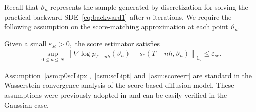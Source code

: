 \documentclass[11pt]{article}
\def\Ltwo{\mathbb L_2}
\def\l|{\left\lVert}
\def\r|{\right\rVert}
\begin{document}
Recall that $\vartheta_n$ represents the sample generated by discretization for solving the practical backward SDE~\eqref{eq:backward1} after $n$ iterations. 
We require the following assumption on the score-matching approximation at each point $\vartheta_n$.
\begin{assumption}
    \label{asm:scoreerr}
Given a small $\varepsilon_{sc}>0,$ the score estimator satisfies
    \begin{align*}
        \sup\limits_{0\leqslant n\leqslant N}\l|\nabla\log p_{T-nh}(\vartheta_n)-s_*(T-nh,\vartheta_n)\r|_{\Ltwo}\leqslant \varepsilon_{sc}.
    \end{align*}
\end{assumption}
Assumption~\ref{asm:p0scLipx},~\ref{asm:scLipt} and~\ref{asm:scoreerr} are standard in the Wasserstein convergence analysis of the score-based diffusion model. These assumptions were previously adopted in \cite{Gao2023WassersteinCG,gao2024convergence} and can be easily verified in the Gaussian case.
\end{document}
